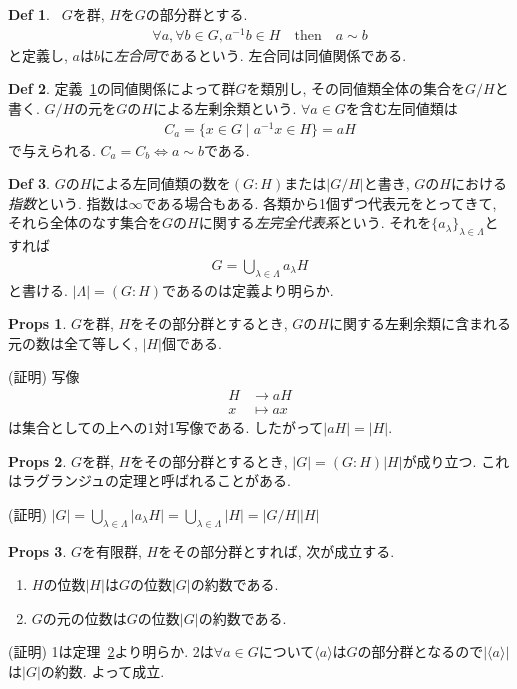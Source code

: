 \documentclass[dvipdfmx]{jsarticle}
\theoremstyle{definition}
\newtheorem{props}{Props}
\newtheorem{definition}{Def}
\numberwithin{equation}{section}
\numberwithin{props}{section}
\numberwithin{definition}{section}
\numberwithin{note}{section}
\begin{document}
\begin{definition}~\label{def::sim}
     $G$を群, $H$を$G$の部分群とする.
     \begin{align}
          \forall a,\forall b\in G, a^{-1}b\in H\quad\mathrm{then}\quad a\sim b
     \end{align}
     と定義し, $a$は$b$に\emph{左合同}であるという. 左合同は同値関係である. 
\end{definition}
\begin{definition}
     定義~\ref{def::sim}の同値関係によって群$G$を類別し, その同値類全体の集合を$G/H$と書く. $G/H$の元を$G$の$H$による左剰余類という. $\forall a\in G$を含む左同値類は
     \begin{align}
          C_a=\lbrace x\in G\mid a^{-1}x\in H\rbrace=aH
     \end{align}
     で与えられる. $C_a=C_b\iff a\sim b$である.
\end{definition}
\begin{definition}
     $G$の$H$による左同値類の数を$(G:H)$または$\lvert G/H\rvert$と書き, $G$の$H$における\emph{指数}という. 指数は$\infty$である場合もある. 各類から1個ずつ代表元をとってきて, それら全体のなす集合を$G$の$H$に関する\emph{左完全代表系}という. それを$\lbrace a_\lambda\rbrace_{\lambda \in \Lambda}$とすれば
     \begin{align}
          G=\bigcup_{\lambda\in \Lambda} a_\lambda H
     \end{align}
     と書ける. $\lvert \Lambda\rvert=(G:H)$であるのは定義より明らか.
\end{definition}
\begin{props}
     $G$を群, $H$をその部分群とするとき, $G$の$H$に関する左剰余類に含まれる元の数は全て等しく, $\lvert H\rvert$個である.
\end{props}
(証明) 写像
\begin{align}
     H&\to aH\\
     x&\mapsto ax
\end{align}
は集合としての上への1対1写像である. したがって$\lvert aH\rvert =\lvert H\rvert$.
\begin{props}\label{them::lagrange}
     $G$を群, $H$をその部分群とするとき, $\lvert G\rvert=(G:H)\lvert H\rvert$が成り立つ. これはラグランジュの定理と呼ばれることがある.
\end{props}
(証明) $\lvert G\rvert=\bigcup_{\lambda\in \Lambda}\lvert a_\lambda H\rvert=\bigcup_{\lambda \in \Lambda}\lvert H\rvert=\lvert G/H\rvert \lvert H\rvert$

\begin{props}
     $G$を有限群, $H$をその部分群とすれば, 次が成立する.
     \begin{enumerate}
          \item $H$の位数$\lvert H\rvert$は$G$の位数$\lvert G\rvert$の約数である.
          \item $G$の元の位数は$G$の位数$\lvert G\rvert$の約数である.
     \end{enumerate}
\end{props}
(証明) 1は定理~\ref{them::lagrange}より明らか.
2は$\forall a\in G$について$\langle a\rangle$は$G$の部分群となるので$\lvert \langle a\rangle \rvert$は$\lvert G\rvert$の約数. よって成立.
\end{document}
